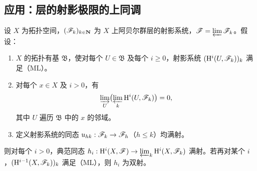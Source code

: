 \subsection{应用：层的射影极限的上同调}
设 $X$ 为拓扑空间，$(\mathscr F_k)_{k\in\mathbf N}$ 为 $X$ 上阿贝尔群层的射影系统，$\mathscr F=\varprojlim\mathscr F_k$。假设：
\begin{enumerate}[label=(\roman*)]
\item $X$ 的拓扑有基 $\mathfrak B$，使对每个 $U\in\mathfrak B$ 及每个 $i\geq0$，射影系统 $(\mathrm H^i(U,\mathscr F_k))_k$ 满足（ML）。
\item 对每个 $x\in X$ 及 $i>0$，有
\[
\varinjlim_U\bigl(\varprojlim_k\mathrm H^i(U,\mathscr F_k)\bigr)=0,
\]
其中 $U$ 遍历 $\mathfrak B$ 中的 $x$ 的邻域。
\item 定义射影系统的同态 $u_{hk}:\mathscr F_k\to\mathscr F_h$（$h\leq k$）均满射。
\end{enumerate}
则对每个 $i>0$，典范同态 $h_i:\mathrm H^i(X,\mathscr F)\to\varprojlim_k\mathrm H^i(X,\mathscr F_k)$ 满射。若再对某个 $i$，$(\mathrm H^{i-1}(X,\mathscr F_k))_k$ 满足（ML），则 $h_i$ 为双射。
